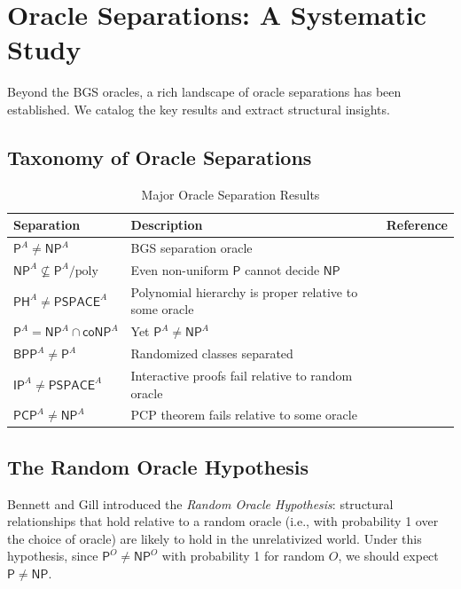 \documentclass[11pt,a4paper]{article}
\theoremstyle{plain}
\theoremstyle{definition}
\theoremstyle{remark}
\newcommand{\PP}{\mathsf{P}}
\newcommand{\NP}{\mathsf{NP}}
\newcommand{\coNP}{\mathsf{coNP}}
\newcommand{\PSPACE}{\mathsf{PSPACE}}
\newcommand{\BPP}{\mathsf{BPP}}
\newcommand{\PH}{\mathsf{PH}}
\newcommand{\IP}{\mathsf{IP}}
\newcommand{\PCP}{\mathsf{PCP}}
\newcommand{\poly}{\mathrm{poly}}
\begin{document}
\section{Oracle Separations: A Systematic Study}\label{sec:oraclesep}

Beyond the BGS oracles, a rich landscape of oracle separations has been
established.  We catalog the key results and extract structural insights.

\subsection{Taxonomy of Oracle Separations}

\begin{table}[H]
\centering
\caption{Major Oracle Separation Results}
\label{tab:oracle_seps}
\begin{tabular}{@{}lp{}l@{}}
\toprule
\textbf{Separation} & \textbf{Description} & \textbf{Reference} \\
\midrule
$\PP^A \neq \NP^A$ & BGS separation oracle & \cite{BGS75} \\
$\NP^A \not\subseteq \PP^A/\poly$ & Even non-uniform $\PP$ cannot decide $\NP$ & \cite{Wil85} \\
$\PH^A \neq \PSPACE^A$ & Polynomial hierarchy is proper relative to some oracle & \cite{Yao85,Hastad89} \\
$\PP^A = \NP^A \cap \coNP^A$ & Yet $\PP^A \neq \NP^A$ & \cite{BI87} \\
$\BPP^A \neq \PP^A$ & Randomized classes separated & \cite{HZ96} \\
$\IP^A \neq \PSPACE^A$ & Interactive proofs fail relative to random oracle & \cite{CCGMS94} \\
$\PCP^A \neq \NP^A$ & PCP theorem fails relative to some oracle & \cite{FRS94} \\
\bottomrule
\end{tabular}
\end{table}

\subsection{The Random Oracle Hypothesis}

Bennett and Gill \cite{BG81} introduced the \emph{Random Oracle Hypothesis}:
structural relationships that hold relative to a random oracle (i.e., with
probability 1 over the choice of oracle) are likely to hold in the unrelativized
world.  Under this hypothesis, since $\PP^O \neq \NP^O$ with probability 1 for
random $O$, we should expect $\PP \neq \NP$.
\end{document}
